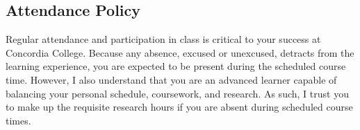 \documentclass{tufte-handout}
\begin{document}
\begin{fullwidth}

\subsection{Attendance Policy}

Regular attendance and participation in class is critical to your success at Concordia College. Because any absence, excused or unexcused, detracts from the learning experience, you are expected to be present during the scheduled course time. However, I also understand that you are an advanced learner capable of balancing your personal schedule, coursework, and research. As such, I trust you to make up the requisite research hours if you are absent during scheduled course times. 



\end{fullwidth}
\end{document}
